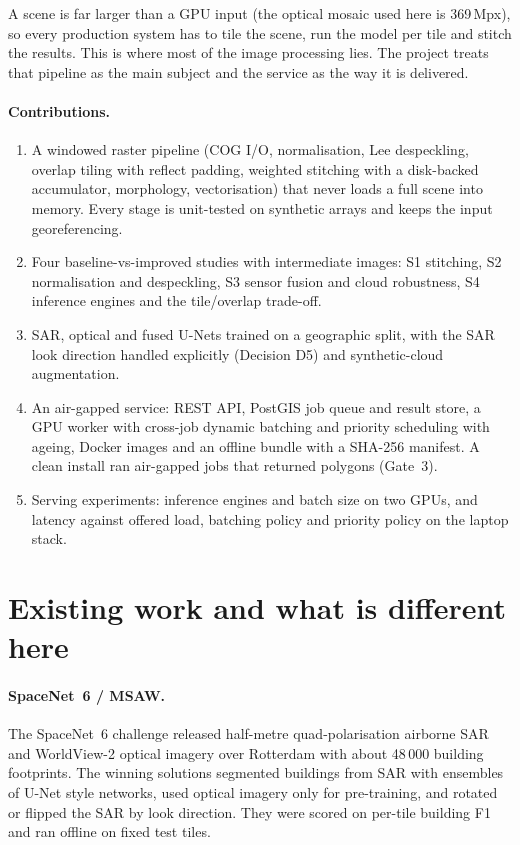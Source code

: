 \documentclass[11pt,a4paper]{article}
\begin{document}
A scene is far larger than a GPU input (the optical mosaic used here is 369\,Mpx), so
every production system has to tile the scene, run the model per tile and stitch the
results. This is where most of the image processing lies. The project treats that
pipeline as the main subject and the service as the way it is delivered.

\paragraph{Contributions.}
\begin{enumerate}
\item A windowed raster pipeline (COG I/O, normalisation, Lee despeckling, overlap tiling
with reflect padding, weighted stitching with a disk-backed accumulator, morphology,
vectorisation) that never loads a full scene into memory. Every stage is unit-tested on
synthetic arrays and keeps the input georeferencing.
\item Four baseline-vs-improved studies with intermediate images:
S1 stitching, S2 normalisation and despeckling, S3 sensor fusion and cloud robustness,
S4 inference engines and the tile/overlap trade-off.
\item SAR, optical and fused U-Nets trained on a geographic split, with the SAR look direction
handled explicitly (Decision D5) and synthetic-cloud augmentation.
\item An air-gapped service: REST API, PostGIS job queue and result store, a GPU worker
with cross-job dynamic batching and priority scheduling with ageing, Docker images and an
offline bundle with a SHA-256 manifest. A clean install ran air-gapped jobs that returned
polygons (Gate~3).
\item Serving experiments: inference engines and batch size on two GPUs, and latency
against offered load, batching policy and priority policy on the laptop stack.
\end{enumerate}

\section{Existing work and what is different here}
\label{sec:related}

\paragraph{SpaceNet~6 / MSAW.}
The SpaceNet~6 challenge \cite{shermeyer2020sn6} released half-metre quad-polarisation
airborne SAR and WorldView-2 optical imagery over Rotterdam with about 48\,000 building
footprints. The winning solutions segmented buildings from SAR with ensembles of U-Net
style networks, used optical imagery only for pre-training, and rotated or flipped the SAR
by look direction. They were scored on per-tile building F1 and ran offline on fixed test
tiles.
\end{document}
